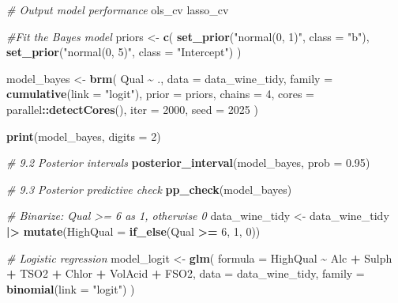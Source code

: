 \documentclass[
  doc,floatsintext]{apa6}
\newenvironment{Shaded}{\begin{snugshade}}{\end{snugshade}}
\newcommand{\AttributeTok}[1]{\textcolor[rgb]{0.13,0.29,0.53}{#1}}
\newcommand{\CommentTok}[1]{\textcolor[rgb]{0.56,0.35,0.01}{\textit{#1}}}
\newcommand{\DecValTok}[1]{\textcolor[rgb]{0.00,0.00,0.81}{#1}}
\newcommand{\FloatTok}[1]{\textcolor[rgb]{0.00,0.00,0.81}{#1}}
\newcommand{\FunctionTok}[1]{\textcolor[rgb]{0.13,0.29,0.53}{\textbf{#1}}}
\newcommand{\NormalTok}[1]{#1}
\newcommand{\OtherTok}[1]{\textcolor[rgb]{0.56,0.35,0.01}{#1}}
\newcommand{\SpecialCharTok}[1]{\textcolor[rgb]{0.81,0.36,0.00}{\textbf{#1}}}
\newcommand{\StringTok}[1]{\textcolor[rgb]{0.31,0.60,0.02}{#1}}
\begin{document}
\begin{Shaded}
\begin{Highlighting}[]
\CommentTok{\# Output model performance}
\NormalTok{ols\_cv}
\NormalTok{lasso\_cv}



\CommentTok{\#Fit the Bayes model }
\NormalTok{priors }\OtherTok{\textless{}{-}} \FunctionTok{c}\NormalTok{(}
  \FunctionTok{set\_prior}\NormalTok{(}\StringTok{"normal(0, 1)"}\NormalTok{, }\AttributeTok{class =} \StringTok{"b"}\NormalTok{),}
  \FunctionTok{set\_prior}\NormalTok{(}\StringTok{"normal(0, 5)"}\NormalTok{, }\AttributeTok{class =} \StringTok{"Intercept"}\NormalTok{)}
\NormalTok{)}

\NormalTok{model\_bayes }\OtherTok{\textless{}{-}} \FunctionTok{brm}\NormalTok{(}
\NormalTok{  Qual }\SpecialCharTok{\textasciitilde{}}\NormalTok{ .,}
  \AttributeTok{data            =}\NormalTok{ data\_wine\_tidy,}
  \AttributeTok{family          =} \FunctionTok{cumulative}\NormalTok{(}\AttributeTok{link =} \StringTok{"logit"}\NormalTok{),}
  \AttributeTok{prior           =}\NormalTok{ priors,}
  \AttributeTok{chains          =} \DecValTok{4}\NormalTok{,}
  \AttributeTok{cores           =}\NormalTok{ parallel}\SpecialCharTok{::}\FunctionTok{detectCores}\NormalTok{(),}
  \AttributeTok{iter            =} \DecValTok{2000}\NormalTok{,}
  \AttributeTok{seed            =} \DecValTok{2025}
\NormalTok{)}

\FunctionTok{print}\NormalTok{(model\_bayes, }\AttributeTok{digits =} \DecValTok{2}\NormalTok{)}

\CommentTok{\# 9.2 Posterior intervals}
\FunctionTok{posterior\_interval}\NormalTok{(model\_bayes, }\AttributeTok{prob =} \FloatTok{0.95}\NormalTok{)}

\CommentTok{\# 9.3 Posterior predictive check}
\FunctionTok{pp\_check}\NormalTok{(model\_bayes)}




\CommentTok{\# Binarize: Qual \textgreater{}= 6 as 1, otherwise 0}
\NormalTok{data\_wine\_tidy }\OtherTok{\textless{}{-}}\NormalTok{ data\_wine\_tidy }\SpecialCharTok{|\textgreater{}}
  \FunctionTok{mutate}\NormalTok{(}\AttributeTok{HighQual =} \FunctionTok{if\_else}\NormalTok{(Qual }\SpecialCharTok{\textgreater{}=} \DecValTok{6}\NormalTok{, }\DecValTok{1}\NormalTok{, }\DecValTok{0}\NormalTok{))}

\CommentTok{\# Logistic regression}
\NormalTok{model\_logit }\OtherTok{\textless{}{-}} \FunctionTok{glm}\NormalTok{(}
  \AttributeTok{formula =}\NormalTok{ HighQual }\SpecialCharTok{\textasciitilde{}}\NormalTok{ Alc }\SpecialCharTok{+}\NormalTok{ Sulph }\SpecialCharTok{+}\NormalTok{ TSO2 }\SpecialCharTok{+}\NormalTok{ Chlor }\SpecialCharTok{+}\NormalTok{ VolAcid }\SpecialCharTok{+}\NormalTok{ FSO2,}
  \AttributeTok{data    =}\NormalTok{ data\_wine\_tidy,}
  \AttributeTok{family  =} \FunctionTok{binomial}\NormalTok{(}\AttributeTok{link =} \StringTok{"logit"}\NormalTok{)}
\NormalTok{)}


\end{Highlighting}
\end{Shaded}
\end{document}

